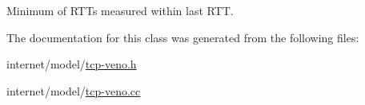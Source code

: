 Minimum of R\+T\+Ts measured within last R\+TT. 



The documentation for this class was generated from the following files\+:\begin{DoxyCompactItemize}
\item 
internet/model/\hyperlink{tcp-veno_8h}{tcp-\/veno.\+h}\item 
internet/model/\hyperlink{tcp-veno_8cc}{tcp-\/veno.\+cc}\end{DoxyCompactItemize}
